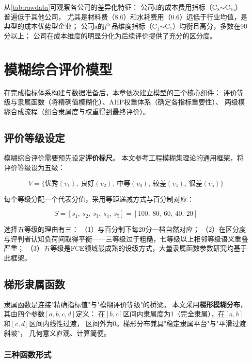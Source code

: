 \documentclass[a4paper,12pt]{ctexart}
\begin{document}
从\cref{tab:rawdata}可观察各公司的差异化特征：
公司d的成本费用指标（C$_8$$\sim$C$_{15}$）普遍低于其他公司，
尤其是材料费（8.6）和水耗费用（0.6）远低于行业均值，是典型的成本优势型企业；
公司a的产品维度指标（C$_1$$\sim$C$_7$）均衡且高分，多数在90分以上；
公司在成本维度的明显分化为后续评价提供了充分的区分度。

\section{模糊综合评价模型}

在完成指标体系构建与数据准备后，本章依次建立模型的三个核心组件：
评价等级与隶属函数（将精确值模糊化）、AHP权重体系（确定各指标重要性）、
两级模糊合成流程（组合隶属度与权重得到最终评价）。

\subsection{评价等级设定}

模糊综合评价需要预先设定\textbf{评价标尺}。
本文参考工程模糊集理论的通用框架\cite{chen2000}，将评价等级设为五级：

\begin{equation}
    V = \{\text{优秀}(v_1),\ \text{良好}(v_2),\ \text{中等}(v_3),\
           \text{较差}(v_4),\ \text{很差}(v_5)\}
\end{equation}

每个等级分配一个代表分值，采用等距递减方式与百分制对应：

\begin{equation}
    S = [s_1,\ s_2,\ s_3,\ s_4,\ s_5] = [100,\ 80,\ 60,\ 40,\ 20]
\end{equation}

选择五等级的理由有三：
（1）与百分制下每20分一档自然对应；
（2）在区分度与评判者认知负荷间取得平衡——三等级过于粗糙，七等级以上相邻等级语义重叠严重；
（3）五等级是FCE领域最成熟的设级方式，大量隶属函数参数研究均基于此框架\cite{xie2000}。

\subsection{梯形隶属函数}

隶属函数是连接"精确指标值"与"模糊评价等级"的桥梁。
本文采用\textbf{梯形模糊分布}，其由四个参数$[a,b,c,d]$定义：
在$[b,c]$区间内隶属度为1（完全隶属），在$[a,b]$和$[c,d]$区间内线性过渡，
区间外为0。梯形分布兼具"稳定隶属平台"与"平滑过渡斜坡"，
几何意义直观、计算简便。

\subsubsection{三种函数形式}
\end{document}
